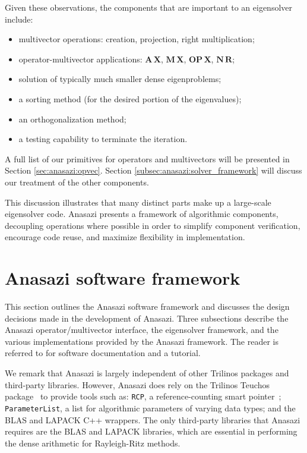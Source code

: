 \documentclass[acmtoms,acmnow]{acmtrans2m}
\begin{document}
Given these observations, the components that are important
to an eigensolver include:
\begin{itemize}
  \item multivector operations: creation,
        projection, right multiplication;
  \item operator-multivector applications:
        $\mathbf{A\,X}$, $\mathbf{M\,X}$, 
        $\mathbf{OP\,X}$, $\mathbf{N\,R}$;
  \item solution of typically much smaller dense eigenproblems;
  \item a sorting method (for the desired portion of the
  eigenvalues);
  \item an orthogonalization method;
  \item a testing capability to terminate the iteration.
\end{itemize}
A full list of our primitives for operators and multivectors
will be presented in Section \ref{sec:anasazi:opvec}.
Section \ref{subsec:anasazi:solver_framework} will discuss
our treatment of the other components.

This discussion illustrates that many distinct parts make up
a large-scale eigensolver code.
Anasazi presents a framework of algorithmic components,
decoupling operations where possible in order to simplify
component verification, encourage code reuse, and maximize
flexibility in implementation.


\section{Anasazi software framework}
\label{sec:framework}

This section outlines the Anasazi software framework and discusses 
the design decisions made in the development of Anasazi. Three
subsections describe the Anasazi operator/multivector interface, the
eigensolver framework, and the various implementations provided by the
Anasazi framework. The reader is referred to
\cite{Trilinos:Anasazi,Trilinos-Tutorial} for software documentation
and a tutorial.

We remark that Anasazi is largely independent of other Trilinos packages and
third-party libraries. However, Anasazi does rely on the Trilinos Teuchos 
package~\cite{Trilinos:Teuchos} to provide tools such as: \texttt{RCP},
a reference-counting smart pointer~\cite{Detlefs:1992:GCR,Teuchos-RCP};
\texttt{ParameterList}, a list for algorithmic parameters of
varying data types; and the BLAS \cite{Lawson:1979:BLA,Blackford:2002:USB} 
and LAPACK \cite{abbd:95} C++ wrappers.
The only third-party libraries that Anasazi requires are the BLAS and
LAPACK libraries, which are essential in performing the dense arithmetic
for Rayleigh-Ritz methods.
\end{document}
